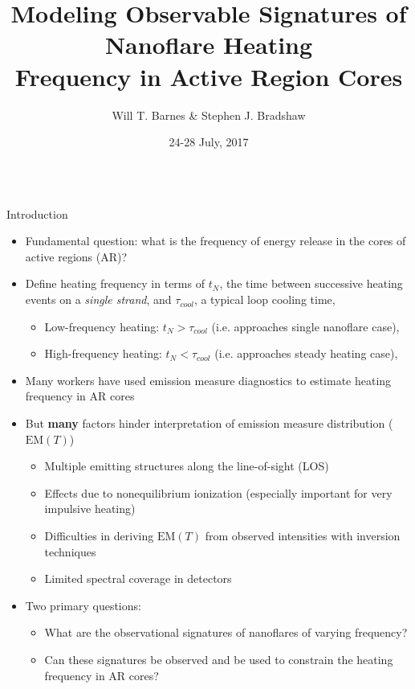 \documentclass[final]{beamer}
\title[Observable Signatures of Nanoflares]{Modeling Observable Signatures of Nanoflare Heating\\Frequency in Active Region Cores}
\author[Barnes \& Bradshaw]{Will T. Barnes \& Stephen J. Bradshaw}
\institute[Rice University]{Department of Physics and Astronomy\\Rice University}
\date{24-28 July, 2017}
\begin{document}
\begin{frame}
  \begin{columns}[T]
  \hfill
  \begin{column}{0.49\linewidth}
    \begin{block}{Introduction}
    \begin{itemize}
      \item Fundamental question: \alert{what is the frequency of energy release in the cores of active regions (AR)?}
      \item Define heating frequency in terms of $t_N$, the time between successive heating events on a \textit{single strand}, and $\tau_{cool}$, a typical loop cooling time,
      \begin{itemize}
        \item Low-frequency heating: $t_N>\tau_{cool}$ (i.e. approaches single nanoflare case), 
        \item High-frequency heating: $t_N<\tau_{cool}$ (i.e. approaches steady heating case), 
      \end{itemize}
      \item Many workers \citep{warren_constraints_2011,winebarger_using_2011,mulu-moore_can_2011,tripathi_emission_2011,schmelz_cold_2012,warren_systematic_2012,del_zanna_evolution_2015} have used emission measure diagnostics to estimate heating frequency in AR cores
      \item But \textbf{many} factors hinder interpretation of emission measure distribution ($\mathrm{EM}(T)$)
      \begin{itemize}
        \item Multiple emitting structures along the line-of-sight (LOS)
        \item Effects due to nonequilibrium ionization (especially important for very impulsive heating)
        \item Difficulties in deriving $\mathrm{EM}(T)$ from observed intensities with inversion techniques
        \item Limited spectral coverage in detectors
      \end{itemize}
      \item Two primary questions:
      \begin{itemize}
        \item \alert{What are the observational signatures of nanoflares of varying frequency?}
        \item \alert{Can these signatures be observed and be used to constrain the heating frequency in AR cores?}

\end{itemize}
\end{itemize}
\end{block}
\end{column}
\end{columns}
\end{frame}
\end{document}
